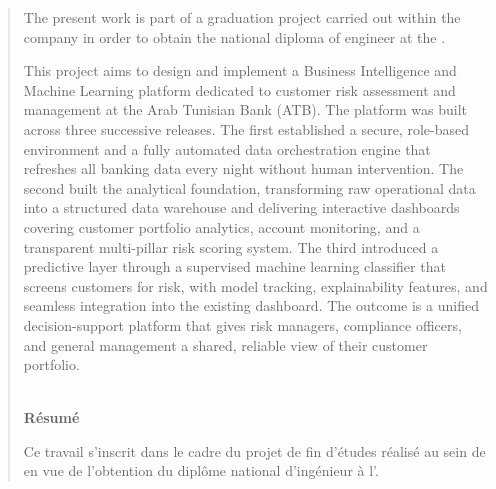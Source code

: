 

\begin{abstract}

The present work is part of a graduation project carried out within the company \studyDepartment in order to obtain the national diploma of engineer at the \ITBS.

This project aims to design and implement a Business Intelligence and Machine Learning platform dedicated to customer risk assessment and management at the Arab Tunisian Bank (ATB). The platform was built across three successive releases. The first established a secure, role-based environment and a fully automated data orchestration engine that refreshes all banking data every night without human intervention. The second built the analytical foundation, transforming raw operational data into a structured data warehouse and delivering interactive dashboards covering customer portfolio analytics, account monitoring, and a transparent multi-pillar risk scoring system. The third introduced a predictive layer through a supervised machine learning classifier that screens customers for risk, with model tracking, explainability features, and seamless integration into the existing dashboard. The outcome is a unified decision-support platform that gives risk managers, compliance officers, and general management a shared, reliable view of their customer portfolio. \\

 \\

\vspace{3cm}
\centerline{\bf Résumé}
\vspace{0.6cm}

Ce travail s'inscrit dans le cadre du projet de fin d'études réalisé au sein de \studyDepartment en vue de l'obtention du diplôme national d'ingénieur à l'\ITBS.


\end{abstract}
